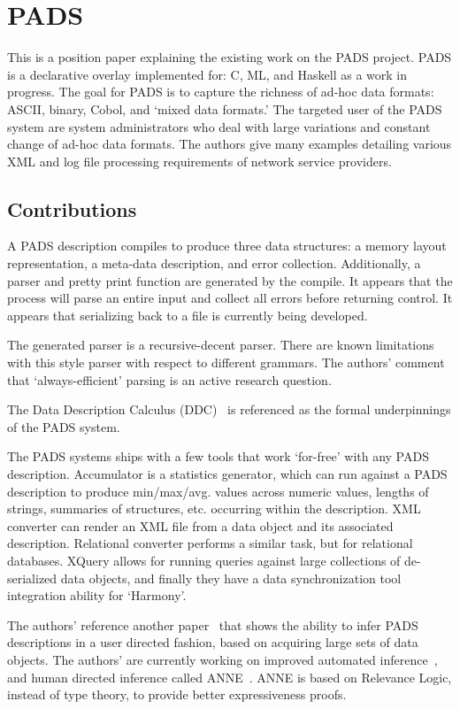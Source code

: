 \section{PADS}

This is a position paper explaining the existing work on 
the PADS project. PADS is a declarative overlay implemented for: C, ML, and
Haskell as a work in progress. The goal for PADS is to capture the richness
of ad-hoc data formats: ASCII, binary, Cobol, and `mixed data formats.' The 
targeted user of the PADS system are system administrators who deal with large
variations and constant change of ad-hoc data formats. The authors give many
examples detailing various XML and log file processing requirements of network
service providers.

\subsection{Contributions}

A PADS description compiles to produce three data structures: a memory layout
representation, a meta-data description, and error collection. Additionally, 
a parser and pretty print function are generated by the compile. It appears that
the process will parse an entire input and collect all errors before returning
control. It appears that serializing back to a file is currently being
developed.

The generated parser is a recursive-decent parser. There are known limitations 
with this style parser with respect to different grammars. The authors' comment
that `always-efficient' parsing is an active research question.

The Data Description Calculus (DDC)~\cite{next_700_ddl} is referenced as the 
formal underpinnings of the PADS system.

The PADS systems ships with a few tools that work `for-free' with any PADS
description. Accumulator is a statistics generator, which can run against
a PADS description to produce min/max/avg. values across numeric values,
lengths of strings, summaries of structures, etc.  occurring within the
description. XML converter can render an XML file from a data object and its
associated description. Relational converter performs a similar task, but 
for relational databases. XQuery allows for running queries against large
collections of de-serialized data objects, and finally they have a data 
synchronization tool integration ability for `Harmony'.

The authors' reference another paper~\cite{dirt_to_shovels} that shows the
ability to infer PADS descriptions in a user directed fashion, based on
acquiring large sets of data objects. The authors' are currently working on
improved automated inference~\cite{inf_syslog}, and human directed inference
called ANNE~\cite{anne}. ANNE is based on Relevance Logic, instead of type
theory, to provide better expressiveness proofs.

